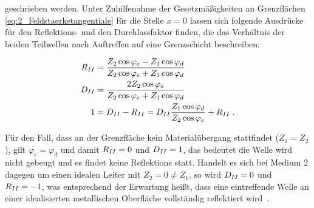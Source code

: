 geschrieben werden. Unter Zuhilfenahme der Gesetzmäßigkeiten an Grenzflächen \Gleichungen \eqref{eq:2_Feldstaerketangentiale} für die Stelle $x=0$ lassen sich folgende Ausdrücke für den Reflektions- und den Durchlassfaktor finden, die das Verhältnis der beiden Teilwellen nach Auftreffen auf eine Grenzschicht beschreiben:

\begin{align}
    R_{\uproman{2}} &= \frac{Z_2 \cos{\varphi_e} - Z_1 \cos{\varphi_d}}{Z_2 \cos{\varphi_e} + Z_1 \cos{\varphi_d}} \\
    D_{\uproman{2}} &= \frac{2 Z_2 \cos{\varphi_e}}{Z_2 \cos{\varphi_e} + Z_1 \cos{\varphi_d}} \\ 
    1 &= D_{\uproman{2}} - R_{\uproman{2}} = D_{\uproman{2}} \frac{Z_1 \cos{\varphi_d}}{Z_2 \cos{\varphi_e}} + R_{\uproman{2}} \; .
\end{align}

Für den Fall, dass an der Grenzfläche kein Materialübergang stattfindet ($Z_1 = Z_2$), gilt $\varphi_e = \varphi_d$ und damit $R_{\uproman{2}} = 0$ und $D_{\uproman{2}} = 1$, das bedeutet die Welle wird nicht gebeugt und es findet keine Reflektions statt. Handelt es sich bei Medium 2 dagegen um einen idealen Leiter mit $Z_2 = 0 \neq Z_1$, so wird $D_{\uproman{2}} = 0$ und $R_{\uproman{2}} = -1$, was entsprechend der Erwartung heißt, dass eine eintreffende Welle an einer idealisierten metallischen Oberfläche vollständig reflektiert wird~\cite{EM_Schirmung}. 






